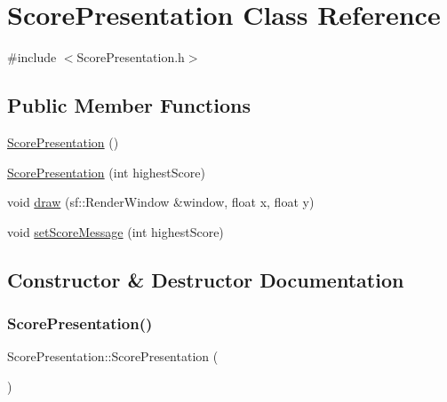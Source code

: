 \hypertarget{class_score_presentation}{}\section{Score\+Presentation Class Reference}
\label{class_score_presentation}


{\ttfamily \#include $<$Score\+Presentation.\+h$>$}

\subsection*{Public Member Functions}
\begin{DoxyCompactItemize}
\item 
\hyperlink{class_score_presentation_afe9c02aa48fe6961fe2bc9798ab18777}{Score\+Presentation} ()
\item 
\hyperlink{class_score_presentation_ac12ced2076cf8686e0e2319cb8852875}{Score\+Presentation} (int highest\+Score)
\item 
void \hyperlink{class_score_presentation_af0e8b8532f70ae4a1d4a0a7ca473ff0f}{draw} (sf\+::\+Render\+Window \&window, float x, float y)
\item 
void \hyperlink{class_score_presentation_adf2c954da3e73d5adbe0e8d30243ee25}{set\+Score\+Message} (int highest\+Score)
\end{DoxyCompactItemize}


\subsection{Constructor \& Destructor Documentation}
\mbox{\label{class_score_presentation_afe9c02aa48fe6961fe2bc9798ab18777}} 
\subsubsection{\texorpdfstring{Score\+Presentation()}{ScorePresentation()}\hspace{0.1cm}{\footnotesize\ttfamily [1/2]}}
{\footnotesize\ttfamily Score\+Presentation\+::\+Score\+Presentation (\begin{DoxyParamCaption}{ }\end{DoxyParamCaption})}

\mbox{\label{class_score_presentation_ac12ced2076cf8686e0e2319cb8852875}} 

